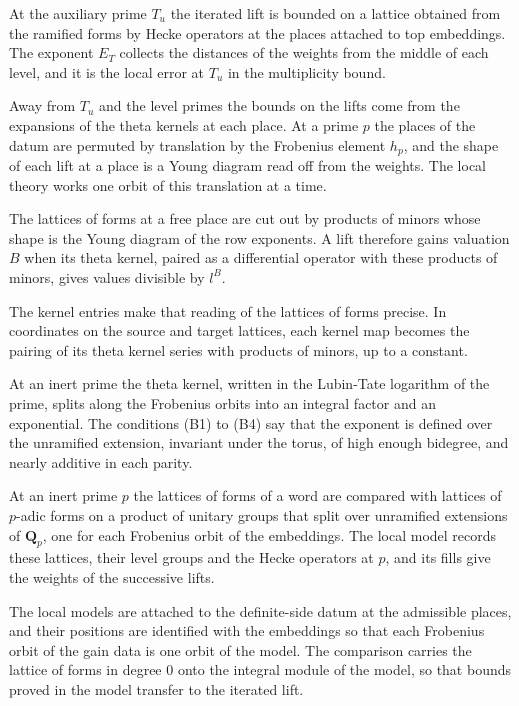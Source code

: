 At the auxiliary prime $T_u$ the iterated lift is bounded on a lattice obtained from the
ramified forms by Hecke operators at the places attached to top embeddings. The exponent $E_T$
collects the distances of the weights from the middle of each level, and it is the local error
at $T_u$ in the multiplicity bound.

Away from $T_u$ and the level primes the bounds on the lifts come from the expansions of the
theta kernels at each place. At a prime $p$ the places of the datum are permuted by translation by
the Frobenius element $h_p$, and the shape of each lift at a place is a Young diagram read off from
the weights. The local theory works one orbit of this translation at a time.

The lattices of forms at a free place are cut out by products of minors whose shape is the Young
diagram of the row exponents. A lift therefore gains valuation $B$ when its theta kernel, paired as
a differential operator with these products of minors, gives values divisible by $l^{B}$.

The kernel entries make that reading of the lattices of forms precise. In coordinates on the source
and target lattices, each kernel map becomes the pairing of its theta kernel series with products
of minors, up to a constant.

At an inert prime the theta kernel, written in the Lubin-Tate logarithm of the prime, splits along
the Frobenius orbits into an integral factor and an exponential. The conditions (B1) to (B4) say
that the exponent is defined over the unramified extension, invariant under the torus, of high
enough bidegree, and nearly additive in each parity.

At an inert prime $p$ the lattices of forms of a word are compared with lattices of $p$-adic forms
on a product of unitary groups that split over unramified extensions of $\mathbf Q_p$, one for each
Frobenius orbit of the embeddings. The local model records these lattices, their level groups and
the Hecke operators at $p$, and its fills give the weights of the successive lifts.

The local models are attached to the definite-side datum at the admissible places, and their
positions are identified with the embeddings so that each Frobenius orbit of the gain data is one
orbit of the model. The comparison carries the lattice of forms in degree $0$ onto the integral
module of the model, so that bounds proved in the model transfer to the iterated lift.

